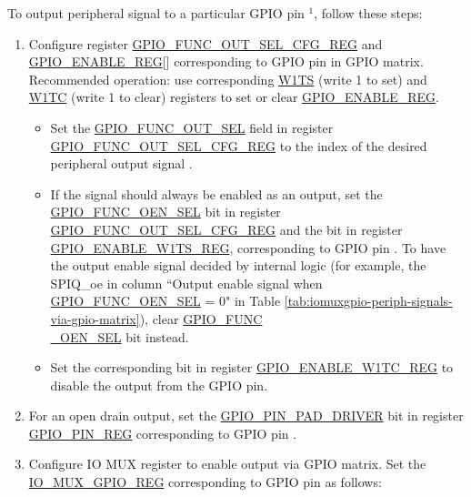 \documentclass[main\_\_EN.tex]{subfiles}
\begin{document}
To output peripheral signal  to a particular GPIO pin \hyperref[output-note-1]{$^1$}, follow these steps:

\begin{enumerate}
    \item Configure register \hyperref[regdesc:GPIOFUNCNOUTSELCFGREG]{GPIO\_FUNC\_OUT\_SEL\_CFG\_REG} and \hyperref[regdesc:GPIOENABLEREG]{GPIO\_ENABLE\_REG}[] corresponding to GPIO pin  in GPIO matrix. Recommended operation: use corresponding \hyperref[regdesc:GPIOENABLEW1TSREG]{W1TS} (write 1 to set) and \hyperref[regdesc:GPIOENABLEW1TCREG]{W1TC} (write 1 to clear) registers to set or clear \hyperref[regdesc:GPIOENABLEREG]{GPIO\_ENABLE\_REG}. 
    \begin{itemize}
        \item Set the \hyperref[fielddesc:GPIOFUNCNOUTSEL]{GPIO\_FUNC\_OUT\_SEL} field in register \hyperref[regdesc:GPIOFUNCNOUTSELCFGREG]{GPIO\_FUNC\_OUT\_SEL\_CFG\_REG} to the index of the desired peripheral output signal .
        \item If the signal should always be enabled as an output, set the \hyperref[fielddesc:GPIOFUNCNOENSEL]{GPIO\_FUNC\_OEN\_SEL} bit in register \hyperref[regdesc:GPIOFUNCNOUTSELCFGREG]{GPIO\_FUNC\_OUT\_SEL\_CFG\_REG} and the bit in register \hyperref[regdesc:GPIOENABLEW1TSREG]{GPIO\_ENABLE\_W1TS\_REG}, corresponding to GPIO pin . To have the output enable signal decided by internal logic (for example, the SPIQ\_oe in column ``Output enable signal when \hyperref[fielddesc:GPIOFUNCNOENSEL]{GPIO\_FUNC\_OEN\_SEL} = 0" in Table \ref{tab:iomuxgpio-periph-signals-via-gpio-matrix}), clear \hyperref[fielddesc:GPIOFUNCNOENSEL]{GPIO\_FUNC\\\_OEN\_SEL} bit instead.
       \item Set the corresponding bit in register \hyperref[regdesc:GPIOENABLEW1TCREG]{GPIO\_ENABLE\_W1TC\_REG} to disable the output from the GPIO pin.
    \end{itemize}
    \item For an open drain output, set the \hyperref[fielddesc:GPIOPINNPADDRIVER]{GPIO\_PIN\_PAD\_DRIVER} bit in register \hyperref[regdesc:GPIOPINNREG]{GPIO\_PIN\_REG} corresponding to GPIO pin .
    \item Configure IO MUX register to enable output via GPIO matrix. Set the \hyperref[regdesc:IOMUXGPIONREG]{IO\_MUX\_GPIO\_REG} corresponding to GPIO pin  as follows:

\end{enumerate}
\end{document}
